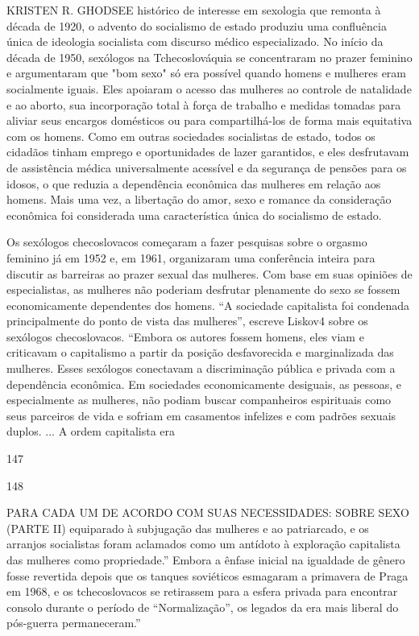  \par 
KRISTEN R. GHODSEE histórico de interesse em sexologia que remonta à década de 1920, o advento do socialismo de estado produziu uma confluência única de ideologia socialista com discurso médico especializado. No início da década de 1950, sexólogos na Tchecoslováquia se concentraram no prazer feminino e argumentaram que "bom sexo" só era possível quando homens e mulheres eram socialmente iguais. Eles apoiaram o acesso das mulheres ao controle de natalidade e ao aborto, sua incorporação total à força de trabalho e medidas tomadas para aliviar seus encargos domésticos ou para compartilhá-los de forma mais equitativa com os homens. Como em outras sociedades socialistas de estado, todos os cidadãos tinham emprego e oportunidades de lazer garantidos, e eles desfrutavam de assistência médica universalmente acessível e da segurança de pensões para os idosos, o que reduzia a dependência econômica das mulheres em relação aos homens. Mais uma vez, a libertação do amor, sexo e romance da consideração econômica foi considerada uma característica única do socialismo de estado.
 \par 
Os sexólogos checoslovacos começaram a fazer pesquisas sobre o orgasmo feminino já em 1952 e, em 1961, organizaram uma conferência inteira para discutir as barreiras ao prazer sexual das mulheres. Com base em suas opiniões de especialistas, as mulheres não poderiam desfrutar plenamente do sexo se fossem economicamente dependentes dos homens. “A sociedade capitalista foi condenada principalmente do ponto de vista das mulheres”, escreve Liskov4 sobre os sexólogos checoslovacos. “Embora os autores fossem homens, eles viam e criticavam o capitalismo a partir da posição desfavorecida e marginalizada das mulheres. Esses sexólogos conectavam a discriminação pública e privada com a dependência econômica. Em sociedades economicamente desiguais, as pessoas, e especialmente as mulheres, não podiam buscar companheiros espirituais como seus parceiros de vida e sofriam em casamentos infelizes e com padrões sexuais duplos. ... A ordem capitalista era
 \par 
147
 \par 
148
 \par 
PARA CADA UM DE ACORDO COM SUAS NECESSIDADES: SOBRE SEXO (PARTE II) equiparado à subjugação das mulheres e ao patriarcado, e os arranjos socialistas foram aclamados como um antídoto à exploração capitalista das mulheres como propriedade.” Embora a ênfase inicial na igualdade de gênero fosse revertida depois que os tanques soviéticos esmagaram a primavera de Praga em 1968, e os tchecoslovacos se retirassem para a esfera privada para encontrar consolo durante o período de “Normalização”, os legados da era mais liberal do pós-guerra permaneceram.”
